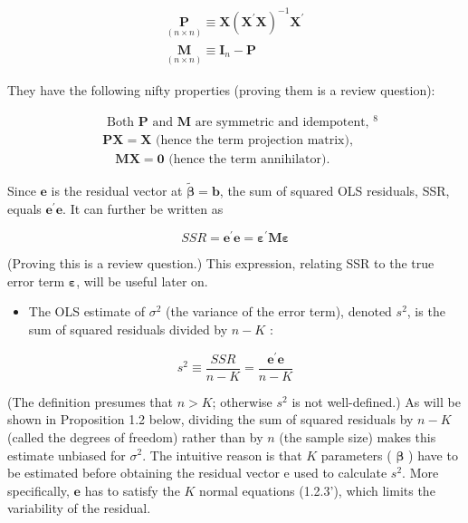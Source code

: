 \documentclass[10pt]{article}
\begin{document}
\begin{gather*}
\underset{(n \times n)}{\mathbf{P}} \equiv \mathbf{X}\left(\mathbf{X}^{\prime} \mathbf{X}\right)^{-1} \mathbf{X}^{\prime}  \tag{1.2.7}\\
\underset{(n \times n)}{\mathbf{M}} \equiv \mathbf{I}_{n}-\mathbf{P} \tag{1.2.8}
\end{gather*}


They have the following nifty properties (proving them is a review question):


\begin{align*}
& \text { Both } \mathbf{P} \text { and } \mathbf{M} \text { are symmetric and idempotent, }{ }^{8}  \tag{1.2.9}\\
& \mathbf{P X}=\mathbf{X} \text { (hence the term projection matrix), }  \tag{1.2.10}\\
& \quad \mathbf{M X}=\mathbf{0} \text { (hence the term annihilator). } \tag{1.2.11}
\end{align*}


Since $\mathbf{e}$ is the residual vector at $\widetilde{\boldsymbol{\beta}}=\mathbf{b}$, the sum of squared OLS residuals, SSR, equals $\mathbf{e}^{\prime} \mathbf{e}$. It can further be written as


\begin{equation*}
S S R=\mathbf{e}^{\prime} \mathbf{e}=\boldsymbol{\varepsilon}^{\prime} \mathbf{M} \boldsymbol{\varepsilon} \tag{1.2.12}
\end{equation*}


(Proving this is a review question.) This expression, relating SSR to the true error term $\boldsymbol{\varepsilon}$, will be useful later on.

\begin{itemize}
  \item The OLS estimate of $\sigma^{2}$ (the variance of the error term), denoted $s^{2}$, is the sum of squared residuals divided by $n-K$ :
\end{itemize}


\begin{equation*}
s^{2} \equiv \frac{S S R}{n-K}=\frac{\mathbf{e}^{\prime} \mathbf{e}}{n-K} \tag{1.2.13}
\end{equation*}


(The definition presumes that $n>K$; otherwise $s^{2}$ is not well-defined.) As will be shown in Proposition 1.2 below, dividing the sum of squared residuals by $n-K$ (called the degrees of freedom) rather than by $n$ (the sample size) makes this estimate unbiased for $\sigma^{2}$. The intuitive reason is that $K$ parameters ( $\boldsymbol{\beta}$ ) have to be estimated before obtaining the residual vector e used to calculate $s^{2}$. More specifically, $\mathbf{e}$ has to satisfy the $K$ normal equations (1.2.3'), which limits the variability of the residual.
\end{document}
